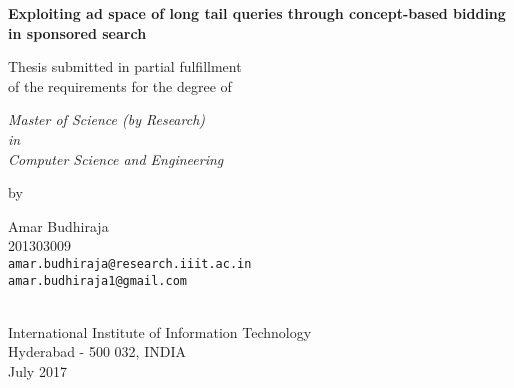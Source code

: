 \thispagestyle{empty}
\begin{center}
\vspace*{1.5cm}
{\Large \bf Exploiting ad space of long tail queries through concept-based bidding in sponsored search}

\vspace*{3.75cm}
{\large Thesis submitted in partial fulfillment\\}
{\large  of the requirements for the degree of \\}

\vspace*{0.5cm}
{\it {\large Master of Science (by Research)} \\
{\large in\\}
{\large Computer Science and Engineering \\}}

\vspace*{0.5cm}
{\large by}

\vspace*{5mm}
{\large Amar Budhiraja\\}
{\large 201303009\\
{\small \tt amar.budhiraja@research.iiit.ac.in}\\
{\small \tt amar.budhiraja1@gmail.com}
}


\vspace*{3.0cm}
{\\}
{\large International Institute of Information Technology\\}
{\large Hyderabad - 500 032, INDIA\\}
{\large July 2017\\}
\end{center}
